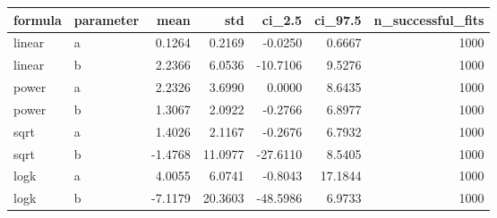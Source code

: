 \begin{tabular}{llrrrrr}
\toprule
formula & parameter & mean & std & ci\_2.5 & ci\_97.5 & n\_successful\_fits \\
\midrule
linear & a & 0.1264 & 0.2169 & -0.0250 & 0.6667 & 1000 \\
linear & b & 2.2366 & 6.0536 & -10.7106 & 9.5276 & 1000 \\
power & a & 2.2326 & 3.6990 & 0.0000 & 8.6435 & 1000 \\
power & b & 1.3067 & 2.0922 & -0.2766 & 6.8977 & 1000 \\
sqrt & a & 1.4026 & 2.1167 & -0.2676 & 6.7932 & 1000 \\
sqrt & b & -1.4768 & 11.0977 & -27.6110 & 8.5405 & 1000 \\
logk & a & 4.0055 & 6.0741 & -0.8043 & 17.1844 & 1000 \\
logk & b & -7.1179 & 20.3603 & -48.5986 & 6.9733 & 1000 \\
\bottomrule
\end{tabular}
